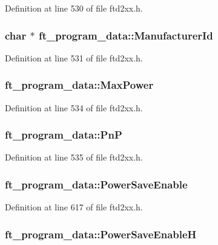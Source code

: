 Definition at line 530 of file ftd2xx.h.\hypertarget{structft__program__data_a2e84082e1e7b7c8e117c19a536813da5}{
\subsubsection[{ManufacturerId}]{\setlength{\rightskip}{0pt plus 5cm}char $\ast$ {\bf ft\_\-program\_\-data::ManufacturerId}}}
\label{structft__program__data_a2e84082e1e7b7c8e117c19a536813da5}


Definition at line 531 of file ftd2xx.h.\hypertarget{structft__program__data_a95bf98d9c0b056d68078bc2d2f66b20e}{
\subsubsection[{MaxPower}]{ {\bf ft\_\-program\_\-data::MaxPower}}}
\label{structft__program__data_a95bf98d9c0b056d68078bc2d2f66b20e}


Definition at line 534 of file ftd2xx.h.\hypertarget{structft__program__data_ac7072dcb805fa05b3614f000498a8aed}{
\subsubsection[{PnP}]{ {\bf ft\_\-program\_\-data::PnP}}}
\label{structft__program__data_ac7072dcb805fa05b3614f000498a8aed}


Definition at line 535 of file ftd2xx.h.\hypertarget{structft__program__data_a84911f0b2d5a0b3e722ddeefdd4470cf}{
\subsubsection[{PowerSaveEnable}]{ {\bf ft\_\-program\_\-data::PowerSaveEnable}}}
\label{structft__program__data_a84911f0b2d5a0b3e722ddeefdd4470cf}


Definition at line 617 of file ftd2xx.h.\hypertarget{structft__program__data_a52194d4e0e5d8f880186dcdb507d966a}{
\subsubsection[{PowerSaveEnableH}]{ {\bf ft\_\-program\_\-data::PowerSaveEnableH}}}
\label{structft__program__data_a52194d4e0e5d8f880186dcdb507d966a}


